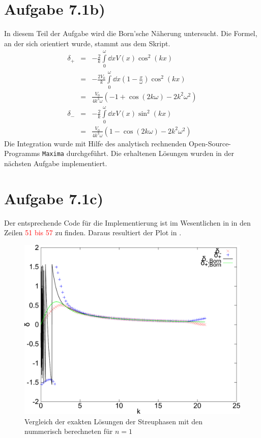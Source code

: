\section*{Aufgabe 7.1b)}
In diesem Teil der Aufgabe wird die Born'sche Näherung untersucht. Die Formel, an
der sich orientiert wurde, stammt aus dem Skript.
\begin{eqnarray}
δ_+ &=& -\frac{2}{k}\int\limits_0^ω\dd{x}V(x)\cos^2(kx)\\
&=& -\frac{2 V_0}{k}\int\limits_0^ω\dd{x}(1-\frac{x}{ω})\cos^2(kx)\\
&=& \frac{V_0}{4k^3 ω} \left(-1 + \cos(2kω) - 2k^2 ω^2\right)\\
δ_- &=& -\frac{2}{k}\int\limits_0^ω\dd{x}V(x)\sin^2(kx)\\
&=& \frac{V_0}{4k^3 ω} \left(1 - \cos(2kω) - 2k^2 ω^2\right)
\end{eqnarray}
Die Integration wurde mit Hilfe des analytisch rechnenden Open-Source-Programms
\texttt{Maxima} durchgeführt. Die erhaltenen Lösungen wurden in der nächsten
Aufgabe implementiert.

\section*{Aufgabe 7.1c)}
Der entsprechende Code für die Implementierung ist im Wesentlichen in 
in den Zeilen \textcolor{red}{51 bis 57} zu finden. Daraus resultiert der Plot in .

\begin{figure}[htb]
  \centering
  \includegraphics[width=0.8\columnwidth,keepaspectratio]{../tmp/71c-crop}
  \caption{Vergleich der exakten Lösungen der Streuphasen mit den nummerisch
  berechneten für $n=1$}
  \label{fig:1c}
\end{figure}

